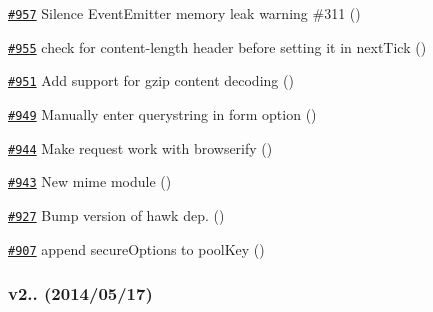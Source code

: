 \begin{DoxyItemize}
\item \href{https://github.com/request/request/pull/957}{\tt \#957} Silence Event\+Emitter memory leak warning \#311 ()
\item \href{https://github.com/request/request/pull/955}{\tt \#955} check for content-\/length header before setting it in next\+Tick ()
\item \href{https://github.com/request/request/pull/951}{\tt \#951} Add support for gzip content decoding ()
\item \href{https://github.com/request/request/pull/949}{\tt \#949} Manually enter querystring in form option ()
\item \href{https://github.com/request/request/pull/944}{\tt \#944} Make request work with browserify ()
\item \href{https://github.com/request/request/pull/943}{\tt \#943} New mime module ()
\item \href{https://github.com/request/request/pull/927}{\tt \#927} Bump version of hawk dep. ()
\item \href{https://github.com/request/request/pull/907}{\tt \#907} append secure\+Options to pool\+Key ()
\end{DoxyItemize}

\subsubsection*{v2.. (2014/05/17)}


